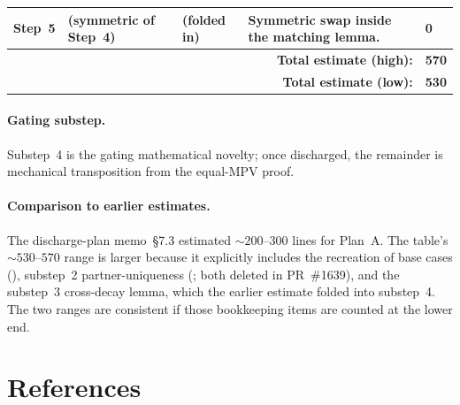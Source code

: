 \documentclass{article}
\theoremstyle{plain}
\begin{document}
\begin{longtable}{p{1.7cm}|p{3.7cm}|p{3.8cm}|p{4.0cm}|p{1.0cm}}
    \hline
    Step~5
                                                         & (symmetric of Step~4)
                                                         & (folded in)
                                                         & Symmetric swap inside the matching lemma.
                                                         & 0                                                                                                                                                                                                                 \\
    \hline
    \multicolumn{4}{r|}{\textbf{Total estimate (high):}} & \textbf{570}                                                                                                                                                                                                      \\
    \multicolumn{4}{r|}{\textbf{Total estimate (low):}}  & \textbf{530}                                                                                                                                                                                                      \\
    \hline
\end{longtable}

\paragraph{Gating substep.}
Substep~4 is the gating mathematical novelty; once discharged, the
remainder is mechanical transposition from the equal-MPV proof.

\paragraph{Comparison to earlier estimates.}
The discharge-plan memo~\S7.3 estimated $\sim 200$--$300$ lines for
Plan~A. The table's $\sim 530$--$570$ range is larger because it
explicitly includes the recreation of base cases
(), substep~2 partner-uniqueness
(; both deleted in PR~\#1639), and the
substep~3 cross-decay lemma, which the earlier estimate folded into
substep~4. The two ranges are consistent if those bookkeeping items
are counted at the lower end.

\section{References}
\end{document}
